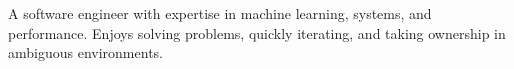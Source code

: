\vspace{-1.0em}
\begin{cventries}
  \vspace{-1.0em}
  \cventry
    {}
    {}
    {}
    {}
    {
        A software engineer with expertise in machine learning, systems, and performance. Enjoys solving problems, quickly iterating, and taking ownership in ambiguous environments. 
    }
\end{cventries}